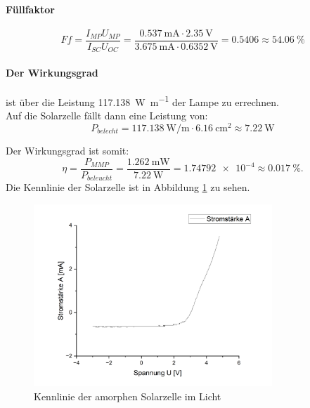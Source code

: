 \documentclass[12pt,a4paper,ngerman]{report}
\begin{document}
		\paragraph{Füllfaktor}
		
		$$    Ff=\frac{I_{MP}U_{MP}}{I_{SC}U_{OC}}= \frac{\qty{0,537}{\milli\ampere}\cdot \qty{2,35}{\volt}}{\qty{3,675}{\milli\ampere} \cdot \qty{0,6352}{\volt}} = \num{0,5406} \approx \qty{54,06}{\percent}  $$
		
		\paragraph{Der Wirkungsgrad} ist über die Leistung \qty{117,138}{\watt\per\m} der Lampe zu errechnen.\\
		Auf die Solarzelle fällt dann eine Leistung von:
		\[P_ {belecht} = \qty{117,138}{\watt\per\m} \cdot \qty{6,16}{\centi\m\squared} \approx \qty{7,22}{\watt}\]
		
		Der Wirkungsgrad ist somit:
		$$
		\eta=\frac{P_{MMP}}{P_{beleucht}} = \frac{\qty{1,262}{\milli\watt}}{\qty{7,22}{\watt}} = \num{1,74792e-4} \approx \qty{0,017}{\percent}.
		$$
		Die Kennlinie der Solarzelle ist in Abbildung \ref{fig:SolarAmorphHell} zu sehen.\\
		
		\begin{figure}
			\centering
			\includegraphics[width=0.8\textwidth]{Origin/SolarAmorphHell.png}
			\caption{Kennlinie der amorphen Solarzelle im Licht}
			\label{fig:SolarAmorphHell}
		\end{figure}
		
		

		


		
		
\end{document}
